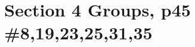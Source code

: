 \documentclass{article}
\newcommand{\assignment}{Section 4 Groups, p45 \#8,19,23,25,31,35}
\begin{document}
\section*{\assignment}
\end{document}
